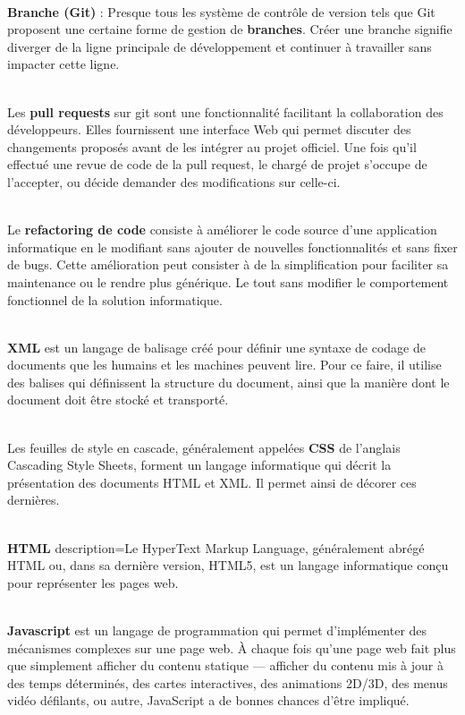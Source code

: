 \documentclass[12pt,oneside,noprintercorrection]{iut}
\begin{document}
 ~\\\indent \textbf{Branche (Git)} : Presque tous les système de contrôle de version tels que Git proposent une certaine forme de gestion de \textbf{branches}. Créer une branche signifie diverger de la ligne principale de développement et continuer à travailler sans impacter cette ligne.\newline


 ~\\\indent Les \textbf{pull requests} sur git sont une fonctionnalité facilitant la collaboration des développeurs. Elles fournissent une interface Web qui permet discuter des changements proposés avant de les intégrer au projet officiel. Une fois qu'il effectué une revue de code de la pull request, le chargé de projet s'occupe de l'accepter, ou décide demander des modifications sur celle-ci.
\newline

 ~\\\indent Le \textbf{refactoring de code} consiste à améliorer le code source d’une application informatique en le modifiant sans ajouter de nouvelles fonctionnalités et sans fixer de bugs. Cette amélioration peut consister à de la simplification pour faciliter sa maintenance ou le rendre plus générique. Le tout sans modifier le comportement fonctionnel de la solution informatique.\newline

 ~\\\indent \textbf{XML} est un langage de balisage créé pour définir une syntaxe de codage de documents que les humains et les machines peuvent lire. Pour ce faire, il utilise des balises qui définissent la structure du document, ainsi que la manière dont le document doit être stocké et transporté.\newline


     ~\\\indent Les feuilles de style en cascade, généralement appelées \textbf{CSS} de l'anglais Cascading Style Sheets, forment un langage informatique qui décrit la présentation des documents HTML et XML. Il permet ainsi de décorer ces dernières.\newline


     ~\\\indent \textbf{HTML}
    description=Le HyperText Markup Language, généralement abrégé HTML ou, dans sa dernière version, HTML5, est un langage informatique conçu pour représenter les pages web.\newline



     ~\\\indent \textbf{Javascript} est un langage de programmation qui permet d'implémenter des mécanismes complexes sur une page web. À chaque fois qu'une page web fait plus que simplement afficher du contenu statique — afficher du contenu mis à jour à des temps déterminés, des cartes interactives, des animations 2D/3D, des menus vidéo défilants, ou autre, JavaScript a de bonnes chances d'être impliqué.
\end{document}
